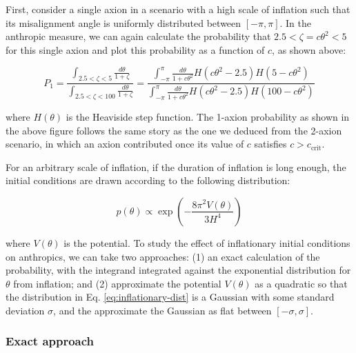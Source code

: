 \documentclass{article}
\begin{document}
First, consider a single axion in a scenario with a high scale of inflation such that its misalignment angle is uniformly distributed between $[-\pi,\pi]$. In the anthropic measure, we can again calculate the probability that $2.5<\zeta=c\theta^2<5$ for this single axion and plot this probability as a function of $c$, as shown above:

\begin{equation}
\label{eq:1axion-prob}
   P_1 = \frac{\int_{2.5<\zeta<5} \frac{d\theta}{1+\zeta}}{\int_{2.5<\zeta<100} \frac{d\theta}{1+\zeta}} = \frac{\int_{-\pi}^{\pi}\frac{d\theta}{1+c\theta^2}H(c\theta^2-2.5)H(5-c\theta^2)}{\int_{-\pi}^{\pi}\frac{d\theta}{1+c\theta^2}H(c\theta^2-2.5)H(100-c\theta^2)}
\end{equation}

\noindent where $H(\theta)$ is the Heaviside step function. The 1-axion probability as shown in the above figure follows the same story as the one we deduced from the 2-axion scenario, in which an axion contributed once its value of $c$ satisfies $c>c_\text{crit}$.

For an arbitrary scale of inflation, if the duration of inflation is long enough, the initial conditions are drawn according to the following distribution:

\begin{equation}
\label{eq:inflationary-dist}
    p(\theta) \propto \exp{\left(-\frac{8\pi^2V(\theta)}{3H^4}\right)}
\end{equation}

\noindent where $V(\theta)$ is the potential. To study the effect of inflationary initial conditions on anthropics, we can take two approaches: (1) an exact calculation of the probability, with the integrand integrated against the exponential distribution for $\theta$ from inflation; and (2) approximate the potential $V(\theta)$ as a quadratic so that the distribution in Eq. \eqref{eq:inflationary-dist} is a Gaussian with some standard deviation $\sigma$, and the approximate the Gaussian as flat between $[-\sigma,\sigma]$.

\subsubsection{Exact approach}
\end{document}
